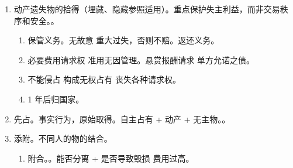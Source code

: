 \begin{enumerate}
\begin{enumerate}
\begin{enumerate}
\begin{enumerate}
                          \item 不准用占有改定。。
                          \item 动产（合法）占有委托物可以。
                          \item {}。
                        \end{enumerate}
                        \begin{kk}{追及效力}
                          \begin{enumerate}
                            \item {}。
                            \item 正常情形，仅 2 方主体。。催促行权，可变可中断。
                            \item 遗失物再转让。。主观起算、剥夺实体权利、不变期间。
                            \item 具有经营资格的经营者 \hz 拍卖取得。。
                          \end{enumerate}
                        \end{kk}
                  \item 动产遗失物的拾得（埋藏、隐藏参照适用）。重点保护失主利益，而非交易秩序和安全。。
                        \begin{enumerate}
                          \item \yi 保管义务。无故意 \hz 重大过失，否则不赔。\er 返还义务。
                          \item \yi 必要费用请求权 \yjt 准用无因管理。\er 悬赏报酬请求 \yjt 单方允诺之债。
                          \item 不能侵占 \yjt 构成无权占有 \yjt 丧失各种请求权。
                          \item 1 年后归国家。
                        \end{enumerate}
                  \item 先占。事实行为，原始取得。自主占有 + 动产 + 无主物。。
                  \item 添附。不同人的物的结合。
                        \begin{enumerate}
                          \item 附合。。能否分离 + 是否导致毁损 \hz 费用过高。

\end{enumerate}
\end{enumerate}
\end{enumerate}
\end{enumerate}
